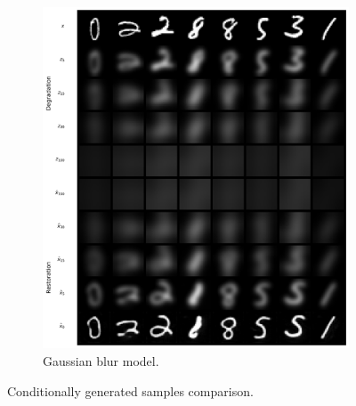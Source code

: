 \documentclass[11pt]{article}
\begin{document}
\begin{figure}[ht]
\begin{subfigure}{.4\textwidth}
        \includegraphics[width=0.9\linewidth]{figs/q2c_blur_cond_samples_norm_8.png}
        \caption{Gaussian blur model.}
        \label{fig:cond_blur}
    \end{subfigure}
    \caption{Conditionally generated samples comparison.}
    \label{fig:q2c_conditional_samples}
\end{figure}
\end{document}

